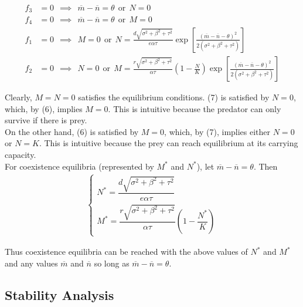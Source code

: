 \documentclass[12pt]{article}
\begin{document}
\begin{align}
	f_3 &= 0 \ \ \implies \ \ \overline{m} - \overline{n} = \theta \ \ \text{or}\ \ N = 0 \\[.1cm]
	f_4 &= 0 \ \ \implies \ \ \overline{m} - \overline{n} = \theta \ \ \text{or}\ \ M = 0 \\[.1cm]
	f_1 &= 0 \ \ \implies \ \ M = 0 \ \ \text{or}\ \ N = \frac{d\sqrt{\sigma^2 + \beta^2 + \tau^2}}{e \alpha \tau}\exp\left[{\frac{(\overline{m} - \overline{n} - \theta)^2}{2(\sigma^2 + \beta^2 + \tau^2)}}\right] \\[.1cm]
	f_2 &= 0 \ \ \implies \ \ N = 0 \ \ \text{or}\ \ M = \frac{r\sqrt{\sigma^2 + \beta^2 + \tau^2}}{\alpha \tau}\left(1 - \frac{N}{K}\right)\exp\left[{\frac{(\overline{m} - \overline{n} - \theta)^2}{2(\sigma^2 + \beta^2 + \tau^2)}}\right]
\end{align}

\vskip 10pt

\noindent Clearly, $M = N = 0$ satisfies the equilibrium conditions.  (7) is satisfied by $N = 0$, which, by (6), implies $M = 0$.  This is intuitive because the predator can only survive if there is prey. \\

\noindent On the other hand, (6) is satisfied by $M = 0$, which, by (7), implies either $N = 0$ or $N = K$.  This is intuitive because the prey can reach equilibrium at its carrying capacity. \\

\noindent For coexistence equilibria (represented by $M^*$ and $N^*$), let $\overline{m} - \overline{n} = \theta$.  Then
\begin{align*}
	\begin{cases}
		N^* = \dfrac{d\sqrt{\sigma^2 + \beta^2 + \tau^2}}{e \alpha \tau} \\[.25cm]
		M^* = \dfrac{r\sqrt{\sigma^2 + \beta^2 + \tau^2}}{\alpha \tau}\left(1 - \dfrac{N^*}{K}\right)
	\end{cases}
\end{align*}

\noindent Thus coexistence equilibria can be reached with the above values of $N^*$ and $M^*$ and any values $\overline{m}$ and $\overline{n}$ so long as $\overline{m} - \overline{n} = \theta$.

\vskip 30pt
							\subsection{Stability Analysis}
\end{document}
